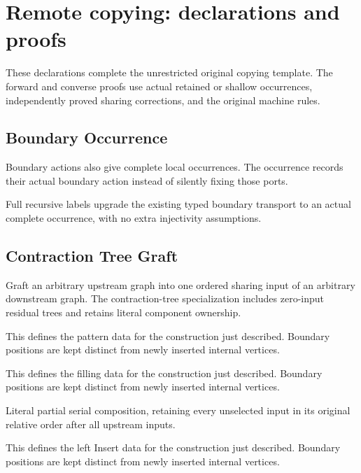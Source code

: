 \clearpage
\section{Remote copying: declarations and proofs}
\label{sec:remote-copying-concordance}
These declarations complete the unrestricted original copying template. The forward and converse proofs use actual retained or shallow occurrences, independently proved sharing corrections, and the original machine rules.

\subsection{Boundary Occurrence}
Boundary actions also give complete local occurrences. The occurrence records their actual boundary action instead of silently fixing those ports.

Full recursive labels upgrade the existing typed boundary transport to an actual complete occurrence, with no extra injectivity assumptions.
\par{}

\subsection{Contraction Tree Graft}
Graft an arbitrary upstream graph into one ordered sharing input of an arbitrary downstream graph. The contraction-tree specialization includes zero-input residual trees and retains literal component ownership.

This defines the pattern data for the construction just described. Boundary positions are kept distinct from newly inserted internal vertices.
\par{}

This defines the filling data for the construction just described. Boundary positions are kept distinct from newly inserted internal vertices.
\par{}

Literal partial serial composition, retaining every unselected input in its original relative order after all upstream inputs.
\par{}

This defines the left Insert data for the construction just described. Boundary positions are kept distinct from newly inserted internal vertices.
\par{}

